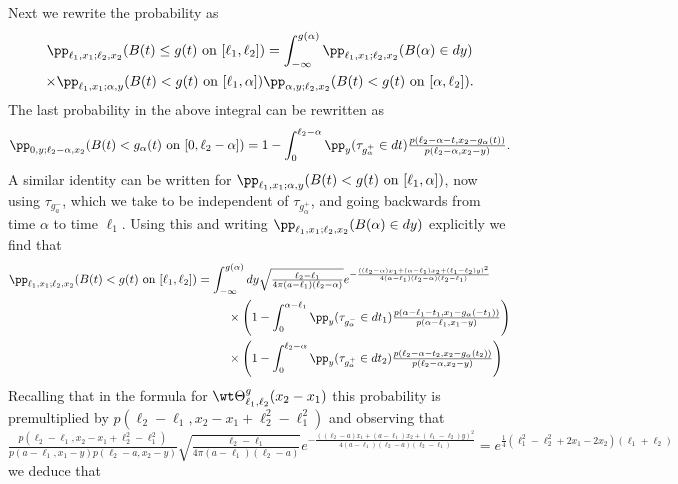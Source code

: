 \documentclass[]{pcmi}
\theoremstyle{plain}
\theoremstyle{definition}
\begin{document}
Next we rewrite the probability as
\begin{multline*}
  \pp_{\ell_1, x_1;\ell_2, x_2}\!\left(B(t)\leq g(t)\text{ on }[\ell_1,\ell_2]\right)
  = \int_{-\infty}^{g(\alpha)}\pp_{\ell_1, x_1; \ell_2, x_2} ( B(\alpha)\in dy)\\
  \times \pp_{\ell_1, x_1; \alpha, y} (B(t)<g(t)\text{ on }[\ell_1,\alpha])\pp_{\alpha, y;\ell_2, x_2}(
  B(t)<g(t)\text{ on } [\alpha,\ell_2]).
\end{multline*}
The last probability in the above integral can be rewritten as
\begin{equation*}
  \pp_{0, y;\ell_2-\alpha, x_2}(B(t)<g_\alpha(t)\text{ on } [0,\ell_2-\alpha])
  =1-\int_0^{\ell_2-\alpha}\pp_y(\tau_{g_\alpha^+}\in dt)\tfrac{p(\ell_2-\alpha-t,x_2-g_\alpha(t))}{p(\ell_2-\alpha,x_2-y)}.
\end{equation*}
A similar identity can be written for $\pp_{\ell_1, x_1; \alpha, y}(B(t)<g(t)\text{ on }[\ell_1,\alpha])$, now using $\tau_{g_a^-}$, which we take to be independent of $\tau_{g_\alpha^+}$, and going backwards from time $\alpha$ to time
$\ell_1$.
Using this and writing $\pp_{\ell_1, x_1; \ell_2, x_2}(B(\alpha)\in dy)$ explicitly we find that
\begin{align*}
  \pp_{\ell_1, x_1;\ell_2, x_2}\!\left(B(t)<g(t)\text{ on }[\ell_1,\ell_2]\right)
  &=\int_{-\infty}^{g(\alpha)}dy\sqrt{\tfrac{\ell_2-\ell_1}{4\pi(a-\ell_1)(\ell_2-\alpha)}}
  e^{-\frac{((\ell_2-\alpha)x_1+(\alpha-\ell_1)x_2+(\ell_1-\ell_2)y)^2}{4(\alpha-\ell_1)(\ell_2-\alpha)(\ell_2-\ell_1)}}\\
  &\hspace{0.35in}\times\left(1-\int_0^{\alpha-\ell_1}\pp_y(\tau_{g_\alpha^-}\in dt_1)\tfrac{p(
      \alpha-\ell_1 - t_1, x_1-g_\alpha(-t_1))}{ p(\alpha-\ell_1 , x_1-y) }\right)\\
  &\hspace{0.35in}\times\left(1-\int_{0}^{\ell_2-\alpha}\pp_y(\tau_{g_\alpha^+}\in dt_2)\tfrac{
      p(\ell_2-\alpha - t_2, x_2-g_\alpha(t_2))}{p(\ell_2-\alpha , x_2-y) } \right)
\end{align*}
Recalling  that in the formula for
$\wt\Theta^g_{\ell_1,\ell_2}(x_2-x_1)$ this probability is premultiplied by
$p(\ell_2-\ell_1,x_2-x_1+\ell_2^2-\ell_1^2)$ and observing that
\[\tfrac{p(\ell_2-\ell_1,x_2-x_1+\ell_2^2-\ell_1^2)}{p(a-\ell_1,x_1-y)p(\ell_2-a,x_2-y)}\sqrt{\tfrac{\ell_2-\ell_1}{4\pi(a-\ell_1)(\ell_2-a)}}
e^{-\frac{((\ell_2-a)x_1+(a-\ell_1)x_2+(\ell_1-\ell_2)y)^2}{4(a-\ell_1)(\ell_2-a)(\ell_2-\ell_1)}}
=e^{\frac14(\ell_1^2-\ell_2^2+2x_1-2x_2)(\ell_1+\ell_2)}\] we deduce that
\end{document}
